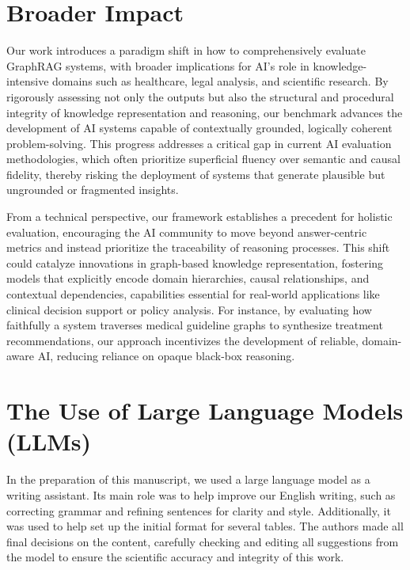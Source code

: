 \documentclass{article} %
\begin{document}
\section{Broader Impact}

Our work introduces a paradigm shift in how to comprehensively evaluate GraphRAG systems, with broader implications for AI’s role in knowledge-intensive domains such as healthcare, legal analysis, and scientific research. By rigorously assessing not only the outputs but also the structural and procedural integrity of knowledge representation and reasoning, our benchmark advances the development of AI systems capable of contextually grounded, logically coherent problem-solving. This progress addresses a critical gap in current AI evaluation methodologies, which often prioritize superficial fluency over semantic and causal fidelity, thereby risking the deployment of systems that generate plausible but ungrounded or fragmented insights.

From a technical perspective, our framework establishes a precedent for holistic evaluation, encouraging the AI community to move beyond answer-centric metrics and instead prioritize the traceability of reasoning processes. This shift could catalyze innovations in graph-based knowledge representation, fostering models that explicitly encode domain hierarchies, causal relationships, and contextual dependencies, capabilities essential for real-world applications like clinical decision support or policy analysis. For instance, by evaluating how faithfully a system traverses medical guideline graphs to synthesize treatment recommendations, our approach incentivizes the development of reliable, domain-aware AI, reducing reliance on opaque black-box reasoning.

\section{The Use of Large Language Models (LLMs)}
In the preparation of this manuscript, we used a large language model as a writing assistant. Its main role was to help improve our English writing, such as correcting grammar and refining sentences for clarity and style. Additionally, it was used to help set up the initial format for several tables. The authors made all final decisions on the content, carefully checking and editing all suggestions from the model to ensure the scientific accuracy and integrity of this work.
\end{document}
